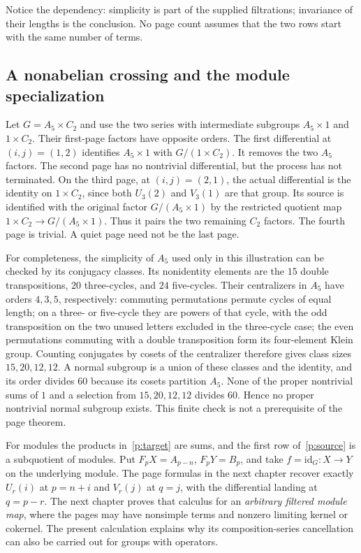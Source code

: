 \documentclass[11pt]{article}
\theoremstyle{definition}
\theoremstyle{remark}\newtheorem{remark}[theorem]{Remark}
\newcommand{\id}{\mathrm{id}}
\begin{document}
Notice the dependency: simplicity is part of the supplied filtrations;
invariance of their lengths is the conclusion. No page count assumes
that the two rows start with the same number of terms.

\subsection{A nonabelian crossing and the module specialization}

Let $G=A_5\times C_2$ and use the two series with intermediate subgroups
$A_5\times1$ and $1\times C_2$. Their first-page factors have opposite
orders. The first differential at $(i,j)=(1,2)$ identifies
$A_5\times1$ with $G/(1\times C_2)$. It removes the two $A_5$ factors.
The second page has no nontrivial differential, but the process has not
terminated. On the third page, at $(i,j)=(2,1)$, the actual differential
is the identity on $1\times C_2$, since both $U_3(2)$ and $V_3(1)$
are that group. Its source is identified with the original factor
$G/(A_5\times1)$ by the restricted quotient map
$1\times C_2\to G/(A_5\times1)$. Thus it pairs the two remaining
$C_2$ factors. The fourth page is trivial. A quiet page need not be the
last page.

For completeness, the simplicity of $A_5$ used only in this illustration
can be checked by its conjugacy classes. Its nonidentity elements are
the $15$ double transpositions, $20$ three-cycles, and $24$ five-cycles.
Their centralizers in $A_5$ have orders $4,3,5$, respectively: commuting
permutations permute cycles of equal length; on a three- or five-cycle they
are powers of that cycle, with the odd transposition on the two unused
letters excluded in the three-cycle case; the even permutations commuting
with a double transposition form its four-element Klein group.
Counting conjugates by cosets of the centralizer therefore gives class
sizes $15,20,12,12$. A normal subgroup is a union of these classes and
the identity, and its order divides $60$ because its cosets partition
$A_5$. None of the proper nontrivial sums of $1$ and a selection from
$15,20,12,12$ divides $60$. Hence no proper nontrivial normal subgroup
exists. This finite check is not a prerequisite of the page theorem.

For modules the products in~\eqref{p:target} are sums, and the first
row of~\eqref{p:source} is a subquotient of modules. Put
$F_pX=A_{p-n}$, $F_pY=B_p$, and take $f=\id_G:X\to Y$ on the
underlying module. The page formulas in the next chapter recover exactly
$U_r(i)$ at $p=n+i$ and $V_r(j)$ at $q=j$, with the differential
landing at $q=p-r$. The next chapter proves that calculus for an
\emph{arbitrary filtered module map}, where the pages may have nonsimple
terms and nonzero limiting kernel or cokernel. The present calculation
explains why its composition-series cancellation can also be carried
out for groups with operators.
\end{document}
